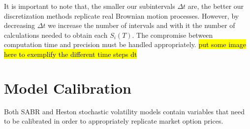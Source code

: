 It is important to note that, the smaller our subintervals $\Delta t$ are, the better our discretization methods replicate real Brownian motion processes. However, by decreasing $\Delta t$ we increase the number of intervals and with it the number of calculations needed to obtain each $S_i(T)$. The compromise between computation time and precision must be handled appropriately.
 \hl{put some image here to exemplify the different time steps dt}



\iffalse
depend on a Brownian motion process, it follows that it is not differentiable. For this reason, it's impossible to exactly simulate such a process. An approximation is possible, however, using discrete jumps of length $\Delta t$ and using the Brownian motion property $W(t)\sim \sqrt{t}N(0,1)$~\cite{Mikosch}, with $N(0,1)$ being a normal distribution with 0 expected value and 1 variance.
We can then simply discretize eq. \eqref{BS} into
\begin{equation}
S(t+\Delta t)=S(t)+rS(t)\Delta t+\sqrt{\Delta t}\sigma S(t)N(0,1),
\end{equation}
\noindent where $\Delta t$ corresponds to a given time step. An example of this discretization is illustrated in \autoref{fig:GBM} with the realization of three sample paths.

\begin{figure}[H]
    \centering
      \texttt{[image: GBM.eps]}
      \caption{Example of three GBM processes, using the parameters $r=\SI{0.06}{\per\year}$, $\sigma=0.05$, $S(0)=\SI{1}[\EUR]{}$ and time steps $\Delta t=10^{-3}\SI{}{\year}$.}\label{fig:GBM}
    \end{figure}
    
By simulating a large number of paths, some underlying tendencies might become apparent, which will prove useful in option pricing.


 American options, however, pose a much greater challenge.  Unlike European options, no analytic pricing model currently exists for this type of derivatives. Several numerical models have been proposed in the past in an attempt to solve this problem~\cite{Wilmott1,Hull}, such as the Longstaff-Schwartz algorithm~\citep{Longstaff}, which we shall approach in later sections of the present thesis.
\fi 

 
 
 
\section{Model Calibration}
\label{section:Model Calibration}
Both SABR and Heston stochastic volatility models contain variables that need to be calibrated in order to appropriately replicate market option prices.

